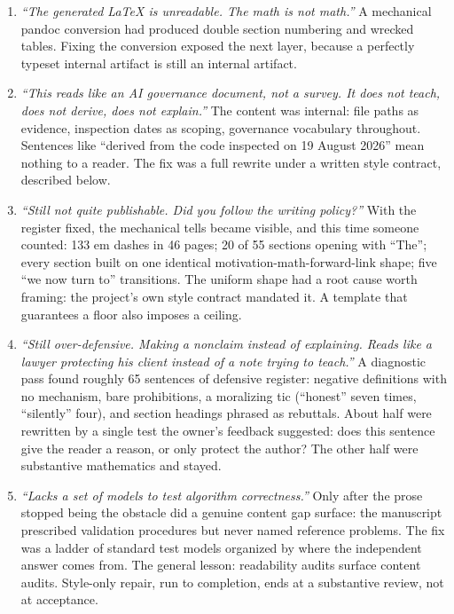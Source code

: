 \begin{enumerate}
\item \emph{``The generated LaTeX is unreadable. The math is not math.''} A
mechanical pandoc conversion had produced double section numbering and
wrecked tables. Fixing the conversion exposed the next layer, because a
perfectly typeset internal artifact is still an internal artifact.
\item \emph{``This reads like an AI governance document, not a survey. It
does not teach, does not derive, does not explain.''} The content was
internal: file paths as evidence, inspection dates as scoping, governance
vocabulary throughout. Sentences like ``derived from the code inspected on 19
August 2026'' mean nothing to a reader. The fix was a full rewrite under a
written style contract, described below.
\item \emph{``Still not quite publishable. Did you follow the writing
policy?''} With the register fixed, the mechanical tells became visible, and
this time someone counted: 133 em dashes in 46 pages; 20 of 55 sections
opening with ``The''; every section built on one identical
motivation-math-forward-link shape; five ``we now turn to'' transitions. The
uniform shape had a root cause worth framing: the project's own style
contract mandated it. A template that guarantees a floor also imposes a
ceiling.
\item \emph{``Still over-defensive. Making a nonclaim instead of explaining.
Reads like a lawyer protecting his client instead of a note trying to
teach.''} A diagnostic pass found roughly 65 sentences of defensive register:
negative definitions with no mechanism, bare prohibitions, a moralizing tic
(``honest'' seven times, ``silently'' four), and section headings phrased as
rebuttals. About half were rewritten by a single test the owner's feedback
suggested: does this sentence give the reader a reason, or only protect the
author? The other half were substantive mathematics and stayed.
\item \emph{``Lacks a set of models to test algorithm correctness.''} Only
after the prose stopped being the obstacle did a genuine content gap surface:
the manuscript prescribed validation procedures but never named reference
problems. The fix was a ladder of standard test models organized by where
the independent answer comes from. The general lesson: readability audits
surface content audits. Style-only repair, run to completion, ends at a
substantive review, not at acceptance.
\end{enumerate}

